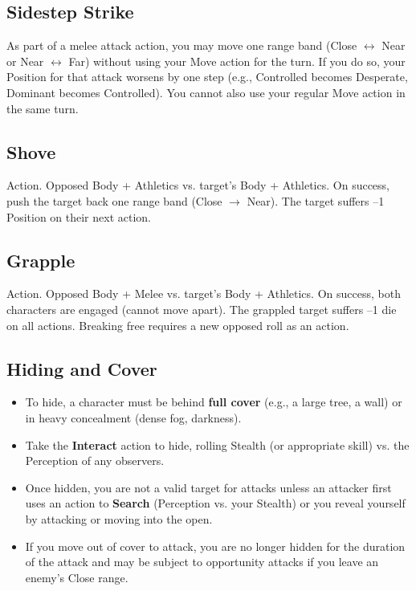 \subsection{Sidestep Strike}

As part of a melee attack action, you may move one range band (Close $\leftrightarrow$ Near or Near $\leftrightarrow$ Far) without using your Move action for the turn. If you do so, your Position for that attack worsens by one step (e.g., Controlled becomes Desperate, Dominant becomes Controlled). You cannot also use your regular Move action in the same turn.

\subsection{Shove}

Action. Opposed Body + Athletics vs. target's Body + Athletics. On success, push the target back one range band (Close $\rightarrow$ Near). The target suffers --1 Position on their next action.

\subsection{Grapple}

Action. Opposed Body + Melee vs. target's Body + Athletics. On success, both characters are engaged (cannot move apart). The grappled target suffers --1 die on all actions. Breaking free requires a new opposed roll as an action.

\subsection{Hiding and Cover}

\begin{itemize}
  \item To hide, a character must be behind \textbf{full cover} (e.g., a large tree, a wall) or in heavy concealment (dense fog, darkness).
  \item Take the \textbf{Interact} action to hide, rolling Stealth (or appropriate skill) vs. the Perception of any observers.
  \item Once hidden, you are not a valid target for attacks unless an attacker first uses an action to \textbf{Search} (Perception vs. your Stealth) or you reveal yourself by attacking or moving into the open.
  \item If you move out of cover to attack, you are no longer hidden for the duration of the attack and may be subject to opportunity attacks if you leave an enemy's Close range.
\end{itemize}

